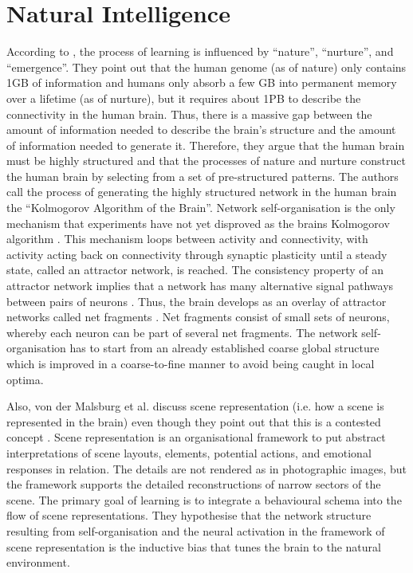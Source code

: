 \section{Natural Intelligence}
According to , the process of learning is influenced by ``nature'', ``nurture'', and ``emergence''.
They point out that the human genome (as of nature) only contains 1GB of information  and humans only absorb a few GB into permanent memory over a lifetime (as of nurture), but it requires about 1PB to describe the connectivity in the human brain.
Thus, there is a massive gap between the amount of information needed to describe the brain's structure and the amount of information needed to generate it.
Therefore, they argue that the human brain must be highly structured and that the processes of nature and nurture construct the human brain by selecting from a set of pre-structured patterns.
The authors call the process of generating the highly structured network in the human brain the ``Kolmogorov Algorithm  of the Brain''.
Network self-organisation is the only mechanism that experiments have not yet disproved as the brains Kolmogorov algorithm .
This mechanism loops between activity and connectivity, with activity acting back on connectivity through synaptic plasticity until a steady state, called an attractor network, is reached.
The consistency property of an attractor network implies that a network has many alternative signal pathways between pairs of neurons .
Thus, the brain develops as an overlay of attractor networks called net fragments .
Net fragments consist of small sets of neurons, whereby each neuron can be part of several net fragments.
The network self-organisation has to start from an already established coarse global structure which is improved in a coarse-to-fine manner to avoid being caught in local optima.

Also, von der Malsburg et al. \cite{von_der_Malsburg_Stadelmann_Grewe_2022} discuss scene representation (i.e. how a scene is represented in the brain) even though they point out that this is a contested concept .
Scene representation is an organisational framework to put abstract interpretations of scene layouts, elements, potential actions, and emotional responses in relation.
The details are not rendered as in photographic images, but the framework supports the detailed reconstructions of narrow sectors of the scene.
The primary goal of learning is to integrate a behavioural schema into the flow of scene representations.
They hypothesise that the network structure resulting from self-organisation and the neural activation in the framework of scene representation is the inductive bias that tunes the brain to the natural environment.

